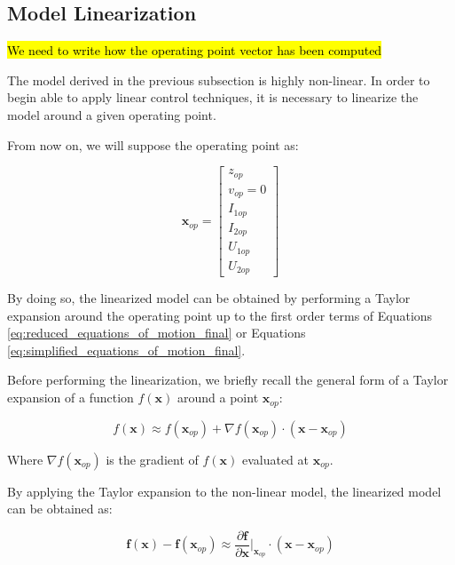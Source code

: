 \subsection{Model Linearization}
\label{subsec:model_linearization}

\hl{We need to write how the operating point vector has been computed}

The model derived in the previous subsection is highly non-linear.
In order to begin able to apply linear control techniques, it is necessary to linearize the model around a given operating point.

From now on, we will suppose the operating point as:

\begin{equation}
    \mathbf{x}_{op} =
    \begin{bmatrix}
        z_{op}     \\
        v_{op} = 0 \\
        I_{1op}    \\
        I_{2op}    \\
        U_{1op}    \\
        U_{2op}
    \end{bmatrix}
\end{equation}

By doing so, the linearized model can be obtained by performing a Taylor expansion around the operating point up to the first order terms of Equations \ref{eq:reduced_equations_of_motion_final} or Equations \ref{eq:simplified_equations_of_motion_final}.

Before performing the linearization, we briefly recall the general form of a Taylor expansion of a function $f(\mathbf{x})$ around a point $\mathbf{x}_{op}$:

\begin{equation}
    f(\mathbf{x}) \approx f(\mathbf{x}_{op}) + \nabla f(\mathbf{x}_{op}) \cdot (\mathbf{x} - \mathbf{x}_{op})
\end{equation}

Where $\nabla f(\mathbf{x}_{op})$ is the gradient of $f(\mathbf{x})$ evaluated at $\mathbf{x}_{op}$.

By applying the Taylor expansion to the non-linear model, the linearized model can be obtained as:

\begin{equation}
    \mathbf{f}(\mathbf{x}) - \mathbf{f}(\mathbf{x}_{op})\approx \frac{\partial \mathbf{f}}{\partial \mathbf{x}} \Bigg|_{\mathbf{x}_{op}} \cdot (\mathbf{x} - \mathbf{x}_{op})
\end{equation}

